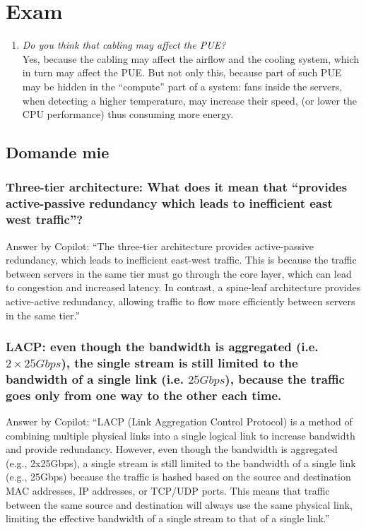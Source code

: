 \chapter{Exam}

\begin{enumerate}
   \item 
   \textit{Do you think that cabling may affect the PUE?}\\
   Yes, because the cabling may affect the airflow and the cooling system, which in turn may affect the PUE.
   But not only this, because part of such PUE may be hidden in the ``compute'' part of a system:
   fans inside the servers, when detecting a higher temperature, may increase their speed, (or lower the CPU performance) thus consuming more energy.
\end{enumerate}


\section{Domande mie}

\subsection{Three-tier architecture: What does it mean that ``provides active-passive redundancy which leads to inefficient east west traffic''?}

Answer by Copilot: 
``The three-tier architecture provides active-passive redundancy, which leads to inefficient east-west traffic. This is because the traffic between servers in the same tier must go through the core layer, which can lead to congestion and increased latency. In contrast, a spine-leaf architecture provides active-active redundancy, allowing traffic to flow more efficiently between servers in the same tier.'' 
   

\subsection{LACP: even though the bandwidth is aggregated (i.e. $2\times 25Gbps$), the single stream is still limited to the bandwidth of a single link (i.e. $25Gbps$), because the traffic goes only from one way to the other each time.}

Answer by Copilot: 
``LACP (Link Aggregation Control Protocol) is a method of combining multiple physical links into a single logical link to increase bandwidth and provide redundancy. However, even though the bandwidth is aggregated (e.g., 2x25Gbps), a single stream is still limited to the bandwidth of a single link (e.g., 25Gbps) because the traffic is hashed based on the source and destination MAC addresses, IP addresses, or TCP/UDP ports. This means that traffic between the same source and destination will always use the same physical link, limiting the effective bandwidth of a single stream to that of a single link.''

